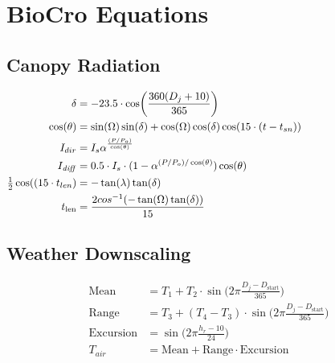 \documentclass[24pt]{report}
\begin{document}
\section*{BioCro Equations}

\subsection*{Canopy Radiation}

\begin{align}
 \delta  &=  -23.5 \cdot \cos\biggl(\frac{360(D_{j}+10)}{365}\biggr) \hspace{2.5in} \label{eqn:delt} \\
 \cos(\theta)   &=  \sin(\Omega)\sin(\delta)+\cos(\Omega)\cos(\delta)\cos(15\cdot(t-t_{sn}))  \label{eqn:costheta}\\
 I_{dir}   &=  I_{s}\alpha^{\frac{(P/P_{o})}{\cos(\theta)}} \label{eqn:Idir}\\
 I_{\mathit{diff}}  &=   0.5 \cdot I_{s}\cdot(1-\alpha^{(P/P_{o})/\cos(\theta)})\cos(\theta) \\%
\tfrac{1}{2} \cos((15 \cdot t_{len})  &=  -\tan(\lambda)\tan(\delta) \label{eqn:costlen}  \\
t_\text{len} &= \frac{2cos^{-1}(-\tan(\Omega)\tan(\delta))}{15}
\end{align}

\subsection*{Weather Downscaling}
\begin{align}
 \text{Mean}  &=  T_{1} + T_{2}\cdot \sin\biggl(2 \pi \frac{D_{j}-D_{\text{start}}}{365}\biggr) \label{eqn:mean} \\
 \text{Range}   &=  T_{3} + (T_{4}-T_{3})\cdot \sin\biggl(2 \pi \frac{D_{j}-D_{\text{start}}}{365}\biggr) \label{eqn:range}\\
 \text{Excursion}  &=   \sin\biggl(2 \pi \frac{h_{r}-10}{24}\biggr) \label{eqn:excur} \\
 T_{air}  &=   \text{Mean} + \text{Range} \cdot \text{Excursion} \label{eqn:Tair} 
\end{align}
\end{document}
